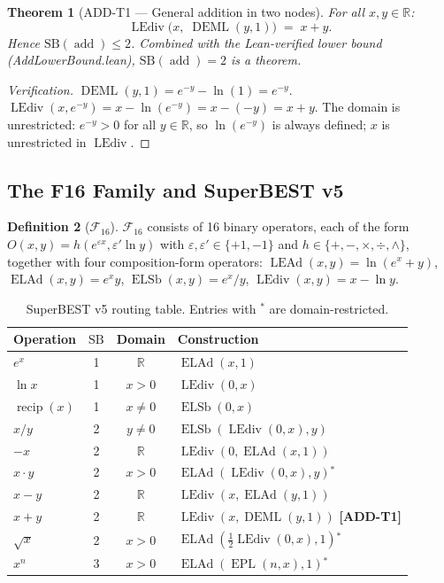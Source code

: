 \documentclass[12pt,a4paper]{article}
\newtheorem{theorem}{Theorem}[section]
\theoremstyle{definition}
\newtheorem{definition}[theorem]{Definition}
\newcommand{\DEML}{\operatorname{DEML}}
\newcommand{\ELAd}{\operatorname{ELAd}}
\newcommand{\ELSb}{\operatorname{ELSb}}
\newcommand{\LEAd}{\operatorname{LEAd}}
\newcommand{\LEdiv}{\operatorname{LEdiv}}
\newcommand{\EPL}{\operatorname{EPL}}
\newcommand{\recip}{\operatorname{recip}}
\newcommand{\addop}{\operatorname{add}}
\newcommand{\SB}{\mathrm{SB}}
\newcommand{\F}{\mathcal{F}_{16}}
\newcommand{\R}{\mathbb{R}}
\begin{document}
\begin{theorem}[ADD-T1 --- General addition in two nodes]
\label{thm:ADD-T1}
For all $x,y\in\R$:
\[
  \LEdiv\!\bigl(x,\;\DEML(y,1)\bigr) \;=\; x + y.
\]
Hence $\SB(\addop) \leq 2$.  Combined with the Lean-verified lower bound
\textup{(AddLowerBound.lean)}, $\SB(\addop) = 2$ is a theorem.
\end{theorem}

\begin{proof}[Verification]
$\DEML(y,1) = e^{-y} - \ln(1) = e^{-y}$.
$\LEdiv(x,e^{-y}) = x - \ln(e^{-y}) = x - (-y) = x + y$.
The domain is unrestricted: $e^{-y}>0$ for all $y\in\R$, so $\ln(e^{-y})$ is
always defined; $x$ is unrestricted in $\LEdiv$.
\end{proof}

\subsection{The F16 Family and SuperBEST v5}

\begin{definition}[$\mathcal{F}_{16}$]
$\F$ consists of 16 binary operators, each of the form
$O(x,y)=h(e^{\varepsilon x}, \varepsilon'\ln y)$ with
$\varepsilon,\varepsilon'\in\{+1,-1\}$ and $h\in\{+,-,\times,\div,\wedge\}$,
together with four composition-form operators:
$\LEAd(x,y)=\ln(e^x+y)$, $\ELAd(x,y)=e^x y$,
$\ELSb(x,y)=e^x/y$, $\LEdiv(x,y)=x-\ln y$.
\end{definition}

\begin{table}[h]
\centering
\caption{SuperBEST v5 routing table.  Entries with $^*$ are domain-restricted.}
\label{tab:v5}
\smallskip
\begin{tabular}{@{}lccl@{}}
\toprule
\textbf{Operation} & \textbf{$\SB$} & \textbf{Domain} & \textbf{Construction} \\
\midrule
$e^x$       & 1 & $\R$         & $\ELAd(x,1)$ \\
$\ln x$     & 1 & $x>0$        & $\LEdiv(0,x)$ \\
$\recip(x)$ & 1 & $x\neq 0$    & $\ELSb(0,x)$ \\
$x/y$       & 2 & $y\neq 0$    & $\ELSb(\LEdiv(0,x),y)$ \\
$-x$        & 2 & $\R$         & $\LEdiv(0,\ELAd(x,1))$ \\
$x\cdot y$  & 2 & $x>0$        & $\ELAd(\LEdiv(0,x),y)$\;$^*$ \\
$x-y$       & 2 & $\R$         & $\LEdiv(x,\ELAd(y,1))$ \\
$x+y$       & 2 & $\R$         & $\LEdiv(x,\DEML(y,1))$ \textbf{[ADD-T1]} \\
$\sqrt{x}$  & 2 & $x>0$        & $\ELAd({\tfrac12}\LEdiv(0,x),1)$\;$^*$ \\
$x^n$       & 3 & $x>0$        & $\ELAd(\EPL(n,x),1)$\;$^*$ \\
\bottomrule
\end{tabular}
\end{table}
\end{document}
